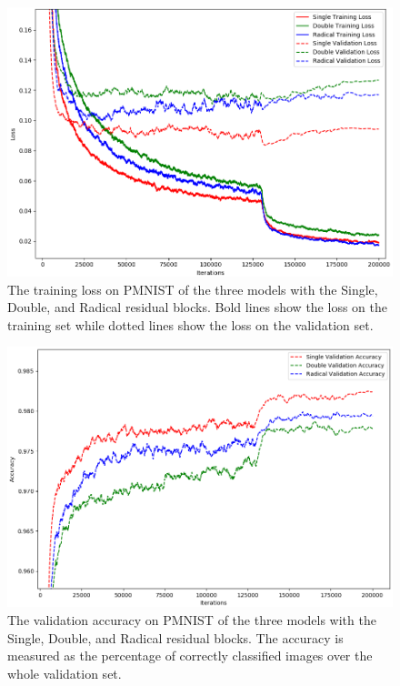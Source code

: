 \documentclass[a4paper, twoside]{article}
\begin{document}
\begin{figure}
\begin{center}
    \includegraphics[width=15cm]{pmnistloss.png}\caption{The training loss on PMNIST of the three models with the Single, Double, and Radical residual blocks. Bold lines show the loss on the training set while dotted lines show the loss on the validation set.}\label{figpmnistloss}
\end{center}
\end{figure}
\begin{figure}
\begin{center}
    \includegraphics[width=15cm]{pmnistacc.png}\caption{The validation accuracy on PMNIST of the three models with the Single, Double, and Radical residual blocks. The accuracy is measured as the percentage of correctly classified images over the whole validation set.}\label{figpmnistacc}
\end{center}
\end{figure}
\end{document}
